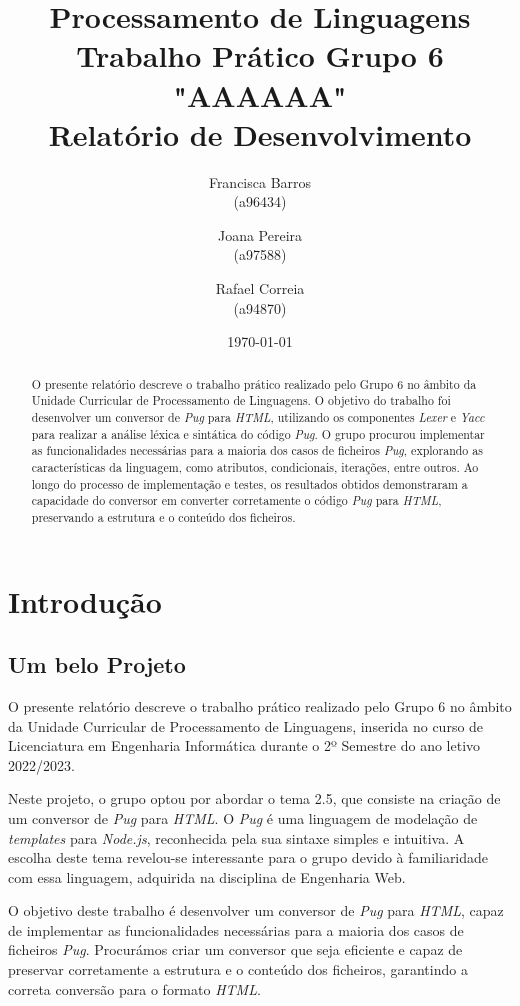 \documentclass[11pt,a4paper]{report}%
\title{Processamento de Linguagens\\
       \textbf{Trabalho Prático Grupo 6 "AAAAAA"}\\ Relatório de Desenvolvimento
       } %
\author{Francisca Barros\\ (a96434) \and Joana Pereira\\ (a97588)
         \and Rafael Correia\\ (a94870)
       } %
\date{\today} %
\def\titulo#1{\section{#1}}    %
\begin{document}
\maketitle %

\begin{abstract}  %


O presente relatório descreve o trabalho prático realizado pelo Grupo 6 no âmbito da Unidade Curricular de Processamento de Linguagens. O objetivo do trabalho foi desenvolver um conversor de \textit{Pug} para \textit{HTML}, utilizando os componentes \textit{Lexer} e \textit{Yacc} para realizar a análise léxica e sintática do código \textit{Pug}. O grupo procurou implementar as funcionalidades necessárias para a maioria dos casos de ficheiros \textit{Pug}, explorando as características da linguagem, como atributos, condicionais, iterações, entre outros. Ao longo do processo de implementação e testes, os resultados obtidos demonstraram a capacidade do conversor em converter corretamente o código \textit{Pug} para \textit{HTML}, preservando a estrutura e o conteúdo dos ficheiros.
\end{abstract}

\tableofcontents %

\chapter{Introdução} \label{chap:intro} %


\titulo{Um belo Projeto}
O presente relatório descreve o trabalho prático realizado pelo Grupo 6 no âmbito da Unidade Curricular de Processamento de Linguagens, inserida no curso de Licenciatura em Engenharia Informática durante o 2º Semestre do ano letivo 2022/2023.

Neste projeto, o grupo optou por abordar o tema 2.5, que consiste na criação de um conversor de \textit{Pug} para \textit{HTML}. O \textit{Pug} é uma linguagem de modelação de \textit{templates} para \textit{Node.js}, reconhecida pela sua sintaxe simples e intuitiva. A escolha deste tema revelou-se interessante para o grupo devido à familiaridade com essa linguagem, adquirida na disciplina de Engenharia Web.

O objetivo deste trabalho é desenvolver um conversor de \textit{Pug} para \textit{HTML}, capaz de implementar as funcionalidades necessárias para a maioria dos casos de ficheiros \textit{Pug}. Procurámos criar um conversor que seja eficiente e capaz de preservar corretamente a estrutura e o conteúdo dos ficheiros, garantindo a correta conversão para o formato \textit{HTML}.
\end{document}
